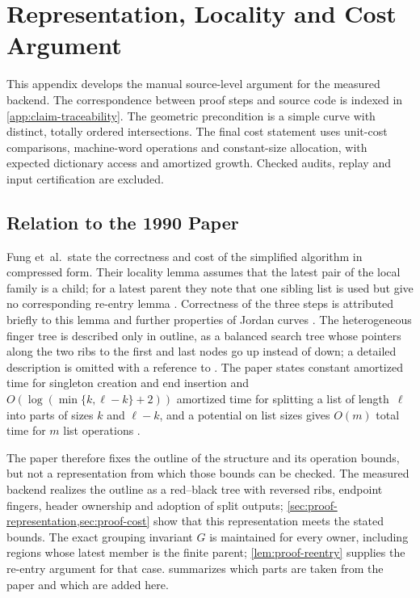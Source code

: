 \chapter{Representation, Locality and Cost Argument}
\label{app:backend-argument}

This appendix develops the manual source-level argument for the measured
backend.
The correspondence between proof steps and source code is indexed in
\cref{app:claim-traceability}. The geometric
precondition is a simple curve with distinct, totally ordered intersections.
The final cost statement uses unit-cost comparisons, machine-word operations
and constant-size allocation, with expected dictionary access and amortized
growth. Checked audits, replay and input certification are excluded.

\section{Relation to the 1990 Paper}
\label{sec:proof-relation}

Fung et~al.\ state the correctness and cost of the simplified algorithm in
compressed form. Their locality lemma assumes that the latest pair of the
local family is a child; for a latest parent they note that one sibling list
is used but give no corresponding re-entry lemma
\parencite[p.~88]{fung1990simplified}. Correctness of the three steps is
attributed briefly to this lemma and further properties of Jordan curves
\parencite[p.~89]{fung1990simplified}. The heterogeneous finger tree is
described only in outline, as a balanced search tree whose pointers along the
two ribs to the first and last nodes go up instead of down; a detailed
description is omitted with a reference to \textcite{tarjan1988triangulating}.
The paper states constant amortized time for singleton creation and end
insertion and $O(\log(\min\{k,\ell-k\}+2))$ amortized time for splitting a
list of length~$\ell$ into parts of sizes $k$ and $\ell-k$, and a potential on
list sizes gives $O(m)$ total time for $m$ list operations
\parencite[pp.~90--91]{fung1990simplified}.

The paper therefore fixes the outline of the structure and its operation
bounds, but not a representation from which those bounds can be checked. The
measured backend realizes the outline as a red--black tree with reversed ribs,
endpoint fingers, header ownership and adoption of split outputs;
\cref{sec:proof-representation,sec:proof-cost} show that this representation
meets the stated bounds. The exact grouping invariant $G$ is maintained for
every owner, including regions whose latest member is the finite parent;
\cref{lem:proof-reentry} supplies the re-entry argument for that case.
 summarizes which parts are taken from the paper and
which are added here.

